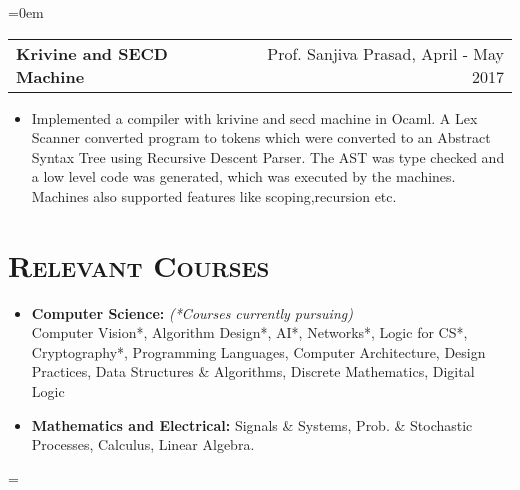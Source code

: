 \documentclass{article}
\makeatletter
\newenvironment{longversion}{}{} %
\newenvironment{absolutelynopagebreak}
  {\par\nobreak\vfil\penalty0\vfilneg
   \vtop\bgroup}
  {\par\xdef\tpd{\the\prevdepth}\egroup
   \prevdepth=\tpd}
\newcommand{\headerrow}[2]
{\begin{tabular*}{\linewidth}{l@{\extracolsep{\fill}}r}
	#1 &
	#2 \\
\end{tabular*}}
\newcommand{\tmpsection}[1]{}
\let\tmpsection=\section
\renewcommand{\section}[1]{\tmpsection*{\textsc{#1}}}
\makeatother
\begin{document}
\begin{absolutelynopagebreak}
\begin{longversion}
\begin{list} {}{\leftmargin=0em}
\item[]
\headerrow{ \textbf{Krivine and SECD Machine}} {Prof. Sanjiva Prasad, April - May 2017}
\begin{itemize} \item[] 
Implemented a compiler with krivine and secd machine in Ocaml. A Lex Scanner converted program to tokens which were converted to an Abstract Syntax Tree using Recursive Descent Parser. The AST was type checked and a low level code was generated, which was executed by the machines. Machines also supported features like scoping,recursion etc.
\end{itemize}



\end{list}


\end{longversion}

\begin{longversion}
\section{Relevant Courses}
\begin{itemize}
\setlength\itemsep{-1em}
\item \textbf{Computer Science:} \hfill \textit{(*Courses currently pursuing)}\\
Computer Vision*, Algorithm Design*, AI*, Networks*, Logic for CS*, Cryptography*, Programming Languages, Computer Architecture, Design Practices, Data Structures \& Algorithms, Discrete Mathematics, Digital Logic\\

\item \textbf{Mathematics and Electrical:}
Signals \& Systems, Prob. \& Stochastic Processes, Calculus, Linear Algebra.\\


\end{itemize}
\end{longversion}
\end{absolutelynopagebreak}
\end{document}
